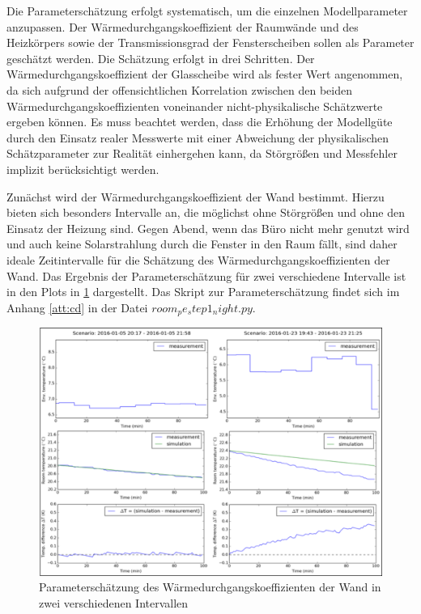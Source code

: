 Die Parameterschätzung erfolgt systematisch, um die einzelnen Modellparameter anzupassen. Der Wärmedurchgangskoeffizient der Raumwände und des Heizkörpers sowie der Transmissionsgrad der Fensterscheiben sollen als Parameter geschätzt werden. Die Schätzung erfolgt in drei Schritten. Der Wärmedurchgangskoeffizient der Glasscheibe wird als fester Wert angenommen, da sich aufgrund der offensichtlichen Korrelation zwischen den beiden Wärmedurchgangskoeffizienten voneinander nicht-physikalische Schätzwerte ergeben können. 
Es muss beachtet werden, dass die Erhöhung der Modellgüte durch den Einsatz realer Messwerte mit einer Abweichung der physikalischen Schätzparameter zur Realität einhergehen kann, da Störgrößen und Messfehler implizit berücksichtigt werden.

Zunächst wird der Wärmedurchgangskoeffizient der Wand bestimmt. Hierzu bieten sich besonders Intervalle an, die möglichst ohne Störgrößen und ohne den Einsatz der Heizung sind. Gegen Abend, wenn das Büro nicht mehr genutzt wird und auch keine Solarstrahlung durch die Fenster in den Raum fällt, sind daher ideale Zeitintervalle für die Schätzung des Wärmedurchgangskoeffizienten der Wand. Das Ergebnis der Parameterschätzung für zwei verschiedene Intervalle ist in den Plots in \ref{fig:step1} dargestellt. Das Skript zur Parameterschätzung findet sich im Anhang \ref{att:cd} in der Datei $room_pe_step1_night.py$.

\begin{figure}
\centering
\includegraphics[width=\textwidth]{abbildungen/20160329_pestep1}
\caption{Parameterschätzung des Wärmedurchgangskoeffizienten der Wand in zwei verschiedenen Intervallen}
\label{fig:step1}
\end{figure}

